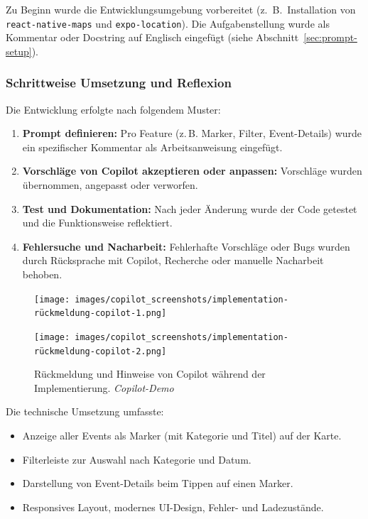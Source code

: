 Zu Beginn wurde die Entwicklungsumgebung vorbereitet (z.~B.\ Installation von
\texttt{react-native-maps} und \texttt{expo-location}). Die Aufgabenstellung
wurde als Kommentar oder Docstring auf Englisch eingefügt (siehe
Abschnitt~\ref{sec:prompt-setup}).

\subsubsection{Schrittweise Umsetzung und Reflexion}
Die Entwicklung erfolgte nach folgendem Muster:
\begin{enumerate}
      \item \textbf{Prompt definieren:} Pro Feature (z.\,B. Marker, Filter, Event-Details) wurde ein spezifischer Kommentar als Arbeitsanweisung eingefügt.
      \item \textbf{Vorschläge von Copilot akzeptieren oder anpassen:} Vorschläge wurden übernommen, angepasst oder verworfen.
      \item \textbf{Test und Dokumentation:} Nach jeder Änderung wurde der Code getestet und die Funktionsweise reflektiert.
      \item \textbf{Fehlersuche und Nacharbeit:} Fehlerhafte Vorschläge oder Bugs wurden durch Rücksprache mit Copilot, Recherche oder manuelle Nacharbeit behoben.
\end{enumerate}

\begin{figure}[htbp]
      \centering
      \vspace{1em}
      \begin{minipage}{0.48\textwidth}
            \centering
            \texttt{[image: images/copilot\_screenshots/implementation-rückmeldung-copilot-1.png]}
      \end{minipage}
      \hfill
      \begin{minipage}{0.48\textwidth}
            \centering
            \texttt{[image: images/copilot\_screenshots/implementation-rückmeldung-copilot-2.png]}
      \end{minipage}
      \caption{Rückmeldung und Hinweise von Copilot während der Implementierung. \textit{Copilot-Demo}}
      \label{fig:copilot-impl-pair}
\end{figure}

\noindent Die technische Umsetzung umfasste:
\begin{itemize}
      \item Anzeige aller Events als Marker (mit Kategorie und Titel) auf der Karte.
      \item Filterleiste zur Auswahl nach Kategorie und Datum.
      \item Darstellung von Event-Details beim Tippen auf einen Marker.
      \item Responsives Layout, modernes UI-Design, Fehler- und Ladezustände.
\end{itemize}

